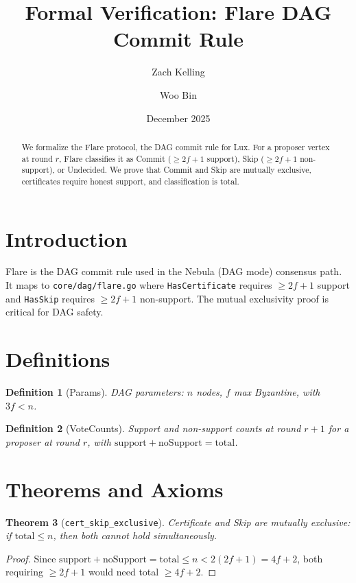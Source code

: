 \documentclass[11pt]{article}
\title{Formal Verification: Flare DAG Commit Rule}
\author{Zach Kelling \and Woo Bin}
\date{December 2025}
\newtheorem{theorem}{Theorem}
\newtheorem{definition}[theorem]{Definition}
\begin{document}
\maketitle

\begin{abstract}
We formalize the Flare protocol, the DAG commit rule for Lux. For a proposer vertex at round $r$, Flare classifies it as Commit ($\geq 2f+1$ support), Skip ($\geq 2f+1$ non-support), or Undecided. We prove that Commit and Skip are mutually exclusive, certificates require honest support, and classification is total.
\end{abstract}

\section{Introduction}
Flare is the DAG commit rule used in the Nebula (DAG mode) consensus path. It maps to \texttt{core/dag/flare.go} where \texttt{HasCertificate} requires $\geq 2f+1$ support and \texttt{HasSkip} requires $\geq 2f+1$ non-support. The mutual exclusivity proof is critical for DAG safety.

\section{Definitions}
\begin{definition}[Params]
DAG parameters: $n$ nodes, $f$ max Byzantine, with $3f < n$.
\end{definition}

\begin{definition}[VoteCounts]
Support and non-support counts at round $r+1$ for a proposer at round $r$, with $\text{support} + \text{noSupport} = \text{total}$.
\end{definition}


\section{Theorems and Axioms}
\begin{theorem}[\texttt{cert\_skip\_exclusive}]
Certificate and Skip are mutually exclusive: if $\text{total} \leq n$, then both cannot hold simultaneously.
\end{theorem}
\begin{proof}
Since $\text{support} + \text{noSupport} = \text{total} \leq n < 2(2f+1) = 4f+2$, both requiring $\geq 2f+1$ would need total $\geq 4f+2$.
\end{proof}
\end{document}
